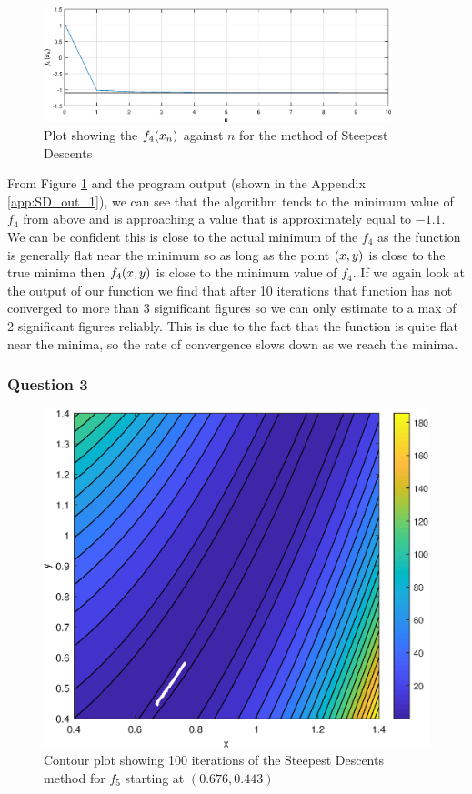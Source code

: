 \documentclass[11pt]{article} %
\let\originalleft\left
\let\originalright\right
\renewcommand{\left}{\mathopen{}\mathclose\bgroup\originalleft}
\renewcommand{\right}{\aftergroup\egroup\originalright}
\begin{document}
\begin{figure}[!h]
	\centering
	\includegraphics[width=0.9\textwidth]{"../Matlab Files/flimit1"}
	\caption{Plot showing the $f_4\left(x_n\right)$ against $n$ for the method of Steepest Descents}
	\label{fig:SD_limit}
\end{figure}
From Figure \ref{fig:SD_limit} and the program output (shown in the Appendix \ref{app:SD_out_1}), we can see that the algorithm tends to the minimum value of $f_4$ from above and is approaching a value that is approximately equal to $-1.1$. We can be confident this is close to the actual minimum of the $f_4$ as the function is generally flat near the minimum so as long as the point $\left(x, y\right)$ is close to the true minima then $f_4\left(x, y\right)$ is close to the minimum value of $f_4$. If we again look at the output of our function we find that after 10 iterations that function has not converged to more than 3 significant figures so we can only estimate to a max of 2 significant figures reliably. This is due to the fact that the function is quite flat near the minima, so the rate of convergence slows down as we reach the minima.

\subsubsection*{Question 3}

\begin{figure}[!h]
	\centering
	\includegraphics{"../Matlab Files/contour4"}
	\caption{Contour plot showing 100 iterations of the Steepest Descents method for $f_5$ starting at $(0.676, 0.443)$}
	\label{fig:SD_f5}
\end{figure}
\end{document}
